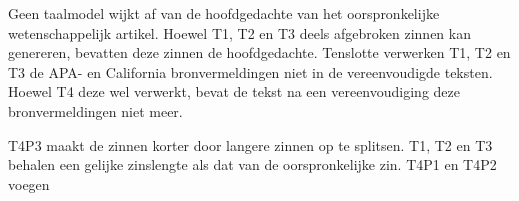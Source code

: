 Geen taalmodel wijkt af van de hoofdgedachte van het oorspronkelijke wetenschappelijk artikel. Hoewel T1, T2 en T3 deels afgebroken zinnen kan genereren, bevatten deze zinnen de hoofdgedachte. Tenslotte verwerken T1, T2 en T3 de APA- en California bronvermeldingen niet in de vereenvoudigde teksten. Hoewel T4 deze wel verwerkt, bevat de tekst na een vereenvoudiging deze bronvermeldingen niet meer. %

\medspace

T4P3 maakt de zinnen korter door langere zinnen op te splitsen. T1, T2 en T3 behalen een gelijke zinslengte als dat van de oorspronkelijke zin. T4P1 en T4P2 voegen 



